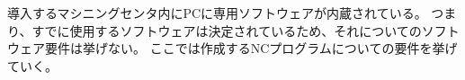 

導入するマシニングセンタ内にPCに専用ソフトウェアが内蔵されている。
つまり、すでに使用するソフトウェアは決定されているため、それについてのソフトウェア要件は挙げない。
ここでは作成するNCプログラムについての要件を挙げていく。



